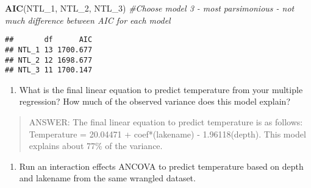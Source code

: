 \documentclass[]{article}
\newenvironment{Shaded}{\begin{snugshade}}{\end{snugshade}}
\newcommand{\KeywordTok}[1]{\textcolor[rgb]{0.13,0.29,0.53}{\textbf{#1}}}
\newcommand{\DecValTok}[1]{\textcolor[rgb]{0.00,0.00,0.81}{#1}}
\newcommand{\StringTok}[1]{\textcolor[rgb]{0.31,0.60,0.02}{#1}}
\newcommand{\CommentTok}[1]{\textcolor[rgb]{0.56,0.35,0.01}{\textit{#1}}}
\newcommand{\OperatorTok}[1]{\textcolor[rgb]{0.81,0.36,0.00}{\textbf{#1}}}
\newcommand{\NormalTok}[1]{#1}
\providecommand{\tightlist}{%
  \setlength{\itemsep}{0pt}\setlength{\parskip}{0pt}}
\begin{document}
\begin{Shaded}
\begin{Highlighting}[]
\KeywordTok{AIC}\NormalTok{(NTL_}\DecValTok{1}\NormalTok{, NTL_}\DecValTok{2}\NormalTok{, NTL_}\DecValTok{3}\NormalTok{) }\CommentTok{#Choose model 3 - most parsimonious - not much difference between AIC for each model}
\end{Highlighting}
\end{Shaded}

\begin{verbatim}
##       df      AIC
## NTL_1 13 1700.677
## NTL_2 12 1698.677
## NTL_3 11 1700.147
\end{verbatim}

\begin{enumerate}
\def\labelenumi{\arabic{enumi}.}
\setcounter{enumi}{12}
\tightlist
\item
  What is the final linear equation to predict temperature from your
  multiple regression? How much of the observed variance does this model
  explain?
\end{enumerate}

\begin{quote}
ANSWER: The final linear equation to predict temperature is as follows:
Temperature = 20.04471 + coef*(lakename) - 1.96118(depth). This model
explains about 77\% of the variance.
\end{quote}

\begin{enumerate}
\def\labelenumi{\arabic{enumi}.}
\setcounter{enumi}{13}
\tightlist
\item
  Run an interaction effects ANCOVA to predict temperature based on
  depth and lakename from the same wrangled dataset.
\end{enumerate}

\begin{Shaded}
\end{Shaded}
\end{document}
